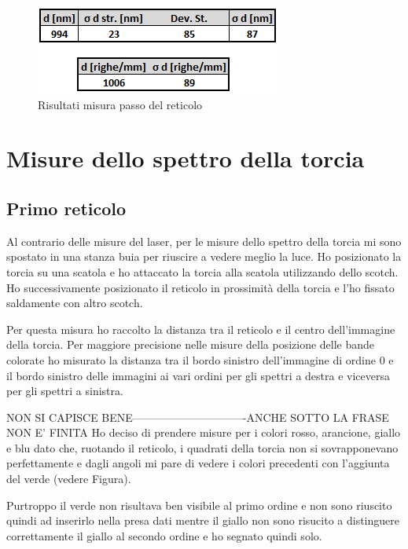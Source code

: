 \documentclass{article}
\begin{document}
\begin{figure}[h!]
  \centering
  \includegraphics[width=0.4\linewidth]{IM risultati laser 2}
  \caption{Risultati misura passo del reticolo}
\end{figure}




\pagebreak
\section{Misure dello spettro della torcia}
\subsection{Primo reticolo}
Al contrario delle misure del laser, per le misure dello spettro della torcia mi sono spostato in una stanza buia per riuscire a vedere meglio la luce. Ho posizionato la torcia su una scatola e ho attaccato la torcia alla scatola utilizzando dello scotch. Ho successivamente posizionato il reticolo in prossimità della torcia e l'ho fissato saldamente con altro scotch.

\vspace{3mm}

Per questa misura ho raccolto la distanza tra il reticolo e il centro dell'immagine della torcia. Per maggiore precisione nelle misure della posizione delle bande colorate ho misurato la distanza tra il bordo sinistro dell'immagine di ordine 0 e il bordo sinistro delle immagini ai vari ordini per gli spettri a destra e viceversa per gli spettri a sinistra. 

\vspace{3mm}
NON SI CAPISCE BENE-------------------------------ANCHE SOTTO LA FRASE NON E' FINITA
Ho deciso di prendere misure per i colori rosso, arancione, giallo e blu dato che, ruotando il reticolo, i quadrati della torcia non si sovrapponevano perfettamente e dagli angoli mi pare di vedere i colori precedenti con l'aggiunta del verde (vedere Figura).%
 
\vspace{3mm}

Purtroppo il verde non risultava ben visibile al primo ordine e non sono riuscito quindi ad inserirlo nella presa dati mentre il giallo non sono risucito a distinguere correttamente il giallo al secondo ordine e ho segnato quindi solo.
\end{document}
